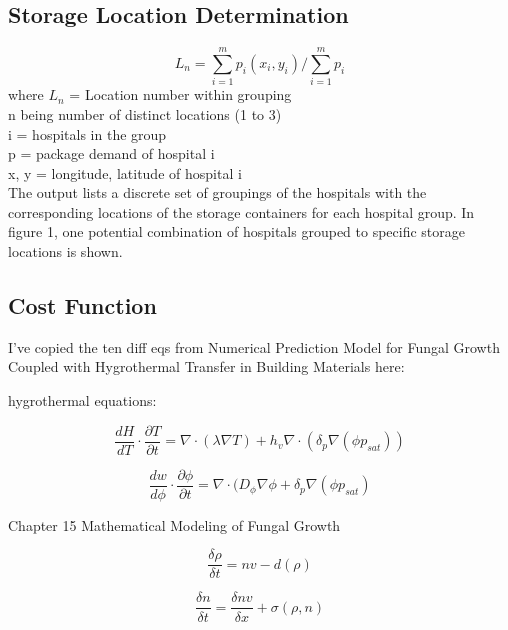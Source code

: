 \documentclass[12pt]{article}
\begin{document}
\begin{multicols}{2}
\subsection{Storage Location Determination}
\lipsum[5]
\[ 
L_n = \sum_{i=1}^{m} p_i(x_i, y_i) / \sum_{i=1}^{m} p_i 
\]
where $L_n$ = Location number within grouping \\
n being number of distinct locations (1 to 3) \\
i = hospitals in the group \\
p = package demand of hospital i \\
x, y = longitude, latitude of hospital i \\
The output lists a discrete set of groupings of the hospitals with the corresponding locations of the storage containers for each hospital group. In figure 1, one potential combination of hospitals grouped to specific storage locations is shown. 



\subsection{Cost Function}
I've copied the ten diff eqs from Numerical Prediction Model for Fungal Growth Coupled with Hygrothermal Transfer in Building Materials here:

hygrothermal equations:

\begin{equation}
\frac{dH}{dT}\cdot\frac{\partial T}{\partial t}=\nabla\cdot(\lambda\nabla T)+h_v\nabla\cdot(\delta_{p}\nabla(\phi p_{sat}))
\end{equation}

\begin{equation}
\frac{dw}{d\phi}\cdot\frac{\partial \phi}{\partial t}=\nabla\cdot(D_{\phi}\nabla\phi+\delta_{p}\nabla(\phi p_{sat})
\end{equation}

Chapter 15 Mathematical Modeling of Fungal Growth

\begin{equation}
\frac{\delta\rho}{\delta t}=nv-d(\rho)
\end{equation}

\begin{equation}
\frac{\delta n}{\delta t}=\frac{\delta nv}{\delta x}+\sigma(\rho, n)
\end{equation}



\end{multicols}
\end{document}
